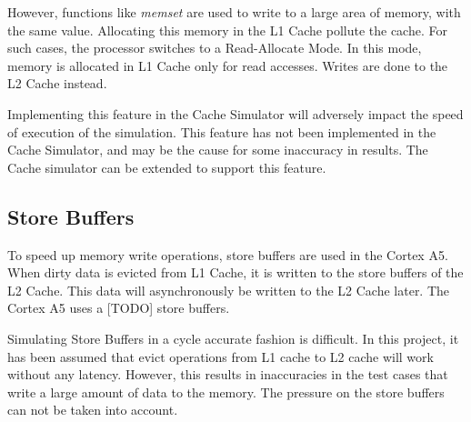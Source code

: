 However, functions like \emph{memset} are used to write to a large area of memory, with the same value. Allocating this memory in the L1 Cache pollute the cache. For such cases, the processor switches to a Read-Allocate Mode. In this mode, memory is allocated in L1 Cache only for read accesses. Writes are done to the L2 Cache instead.

Implementing this feature in the Cache Simulator will adversely impact the speed of execution of the simulation. This feature has not been implemented in the Cache Simulator, and may be the cause for some inaccuracy in results. The Cache simulator can be extended to support this feature.

\subsection{Store Buffers}
To speed up memory write operations, store buffers are used in the Cortex A5. When dirty data is evicted from L1 Cache, it is written to the store buffers of the L2 Cache. This data will asynchronously be written to the L2 Cache later. The Cortex A5 uses a [TODO] store buffers.

Simulating Store Buffers in a cycle accurate fashion is difficult. In this project, it has been assumed that evict operations from L1 cache to L2 cache will work without any latency. However, this results in inaccuracies in the test cases that write a large amount of data to the memory. The pressure on the store buffers can not be taken into account. 

